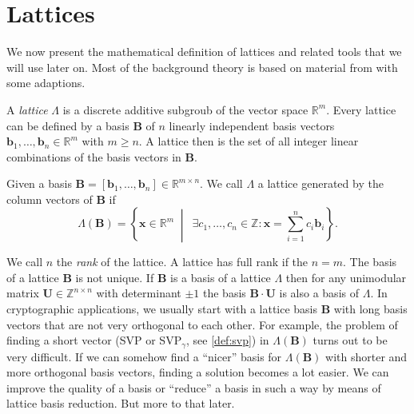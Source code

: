\section{Lattices}
We now present the mathematical definition of lattices and related tools that we will use later on. Most of the background theory is based on material from \cite{MG02} with some adaptions.

A \textit{lattice} $\Lambda$ is a discrete additive subgroub of the vector space $\mathbb{R}^m$. Every lattice can be defined by a basis $\mathbf{B}$ of $n$ linearly independent basis vectors $\mathbf{b}_1, \ldots, \mathbf{b}_n \in \mathbb{R}^m$ with $m\geq n$. A lattice then is the set of all integer linear combinations of the basis vectors in $\mathbf{B}$.

\begin{definition}[Lattice]
    Given a basis $\mathbf{B} = \left[\mathbf{b}_1, \ldots, \mathbf{b}_n\right] \in \mathbb{R}^{m\times n}$. We call $\Lambda$ a lattice generated by the column vectors of $\mathbf{B}$ if
    \begin{equation}
        \Lambda(\mathbf{B}) = \left\{ \mathbf{x} \in \mathbb{R}^m \;\middle\vert\ \; \exists c_1, \ldots, c_n \in \mathbb{Z} : \mathbf{x} = \sum_{i=1}^n c_i \mathbf{b}_i \right\}.
    \end{equation}
\end{definition}

We call $n$ the \textit{rank} of the lattice. A lattice has full rank if the $n=m$. The basis of a lattice $\mathbf{B}$ is not unique. If $\mathbf{B}$ is a basis of a lattice $\Lambda$ then for any unimodular matrix $\mathbf{U}\in \mathbb{Z}^{n\times n}$ with determinant $\pm 1$ the basis $\mathbf{B}\cdot \mathbf{U}$ is also a basis of $\Lambda$. In cryptographic applications, we usually start with a lattice basis $\mathbf{B}$ with long basis vectors that are not very orthogonal to each other. For example, the problem of finding a short vector (SVP or SVP$_\gamma$, see \cref{def:svp}) in $\Lambda(\mathbf{B})$ turns out to be very difficult. If we can somehow find a ``nicer'' basis for $\Lambda(\mathbf{B})$ with shorter and more orthogonal basis vectors, finding a solution becomes a lot easier. We can improve the quality of a basis or ``reduce'' a basis in such a way by means of lattice basis reduction. But more to that later.

